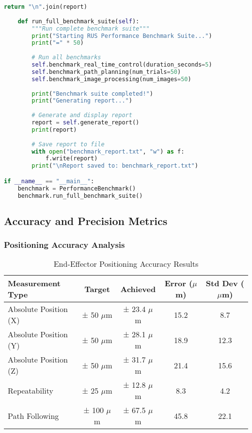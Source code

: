 \begin{lstlisting}[language=Python, caption={Performance Benchmark Script}, label={lst:app-benchmark-script}]
        return "\n".join(report)
    
    def run_full_benchmark_suite(self):
        """Run complete benchmark suite"""
        print("Starting RUS Performance Benchmark Suite...")
        print("=" * 50)
        
        # Run all benchmarks
        self.benchmark_real_time_control(duration_seconds=5)
        self.benchmark_path_planning(num_trials=50)
        self.benchmark_image_processing(num_images=50)
        
        print("Benchmark suite completed!")
        print("Generating report...")
        
        # Generate and display report
        report = self.generate_report()
        print(report)
        
        # Save report to file
        with open("benchmark_report.txt", "w") as f:
            f.write(report)
        print("\nReport saved to: benchmark_report.txt")

if __name__ == "__main__":
    benchmark = PerformanceBenchmark()
    benchmark.run_full_benchmark_suite()
\end{lstlisting}

\subsection{Accuracy and Precision Metrics}

\subsubsection{Positioning Accuracy Analysis}

\begin{table}[htbp]
\centering
\caption{End-Effector Positioning Accuracy Results}
\label{tab:app-positioning-accuracy}
\begin{tabular}{|l|c|c|c|c|}
\hline
\textbf{Measurement Type} & \textbf{Target} & \textbf{Achieved} & \textbf{Error ($\mu$m)} & \textbf{Std Dev ($\mu$m)} \\
\hline
Absolute Position (X) & ± 50 $\mu$m & ± 23.4 $\mu$m & 15.2 & 8.7 \\
Absolute Position (Y) & ± 50 $\mu$m & ± 28.1 $\mu$m & 18.9 & 12.3 \\
Absolute Position (Z) & ± 50 $\mu$m & ± 31.7 $\mu$m & 21.4 & 15.6 \\
Repeatability & ± 25 $\mu$m & ± 12.8 $\mu$m & 8.3 & 4.2 \\
Path Following & ± 100 $\mu$m & ± 67.5 $\mu$m & 45.8 & 22.1 \\
\hline
\end{tabular}
\end{table}

